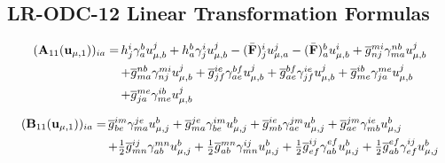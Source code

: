 \begin{subappendices}
    \section{LR-ODC-12 Linear Transformation Formulas}
    \label{sec:linear-transformation-formulas}

    \begin{equation}
        \begin{array}{r@{\,}l}
            (\mathbf{A}_{11}(\mathbf{u}_{\mu,1}))_{ia}
            =
            &
            h_j^i
            \gamma_a^b
            u_{\mu,b}^j
            +
            h_a^b
            \gamma_j^i
            u_{\mu,b}^j
            -
            (\bar{\mathbf{F}})_j^i
            u_{\mu,a}^j
            -
            (\bar{\mathbf{F}})_a^b
            u_{\mu,b}^i
            +
            \overline{g}_{nj}^{mi}
            \gamma_{ma}^{nb}
            u_{\mu,b}^j
            \\[5pt]
            &
            +
            \overline{g}_{ma}^{nb}
            \gamma_{nj}^{mi}
            u_{\mu,b}^j
            +
            \overline{g}_{jf}^{ie}
            \gamma_{ae}^{bf}
            u_{\mu,b}^j
            +
            \overline{g}_{ae}^{bf}
            \gamma_{jf}^{ie}
            u_{\mu,b}^j
            +
            \overline{g}_{me}^{ib}
            \gamma_{ja}^{me}
            u_{\mu,b}^j
            \\[5pt]
            &
            +
            \overline{g}_{ja}^{me}
            \gamma_{me}^{ib}
            u_{\mu,b}^j
        \end{array}
    \end{equation}

    \begin{equation}
        \begin{array}{r@{\,}l}
            (\mathbf{B}_{11}(\mathbf{u}_{\mu,1}))_{ia}
            =
            &
            \overline{g}_{be}^{im}
            \gamma_{ma}^{je}
            u_{\mu,j}^b
            +
            \overline{g}_{ma}^{je}
            \gamma_{be}^{im}
            u_{\mu,j}^b
            +
            \overline{g}_{mb}^{ie}
            \gamma_{ae}^{jm}
            u_{\mu,j}^b
            +
            \overline{g}_{ae}^{jm}
            \gamma_{mb}^{ie}
            u_{\mu,j}^b
            \\[5pt]
            &
            +
            \tfrac{1}{2}
            \overline{g}_{mn}^{ij}
            \gamma_{ab}^{mn}
            u_{\mu,j}^b
            +
            \tfrac{1}{2}
            \overline{g}_{ab}^{mn}
            \gamma_{mn}^{ij}
            u_{\mu,j}^b
            +
            \tfrac{1}{2}
            \overline{g}_{ef}^{ij}
            \gamma_{ab}^{ef}
            u_{\mu,j}^b
            +
            \tfrac{1}{2}
            \overline{g}_{ab}^{ef}
            \gamma_{ef}^{ij}
            u_{\mu,j}^b
        \end{array}
    \end{equation}


\end{subappendices}
